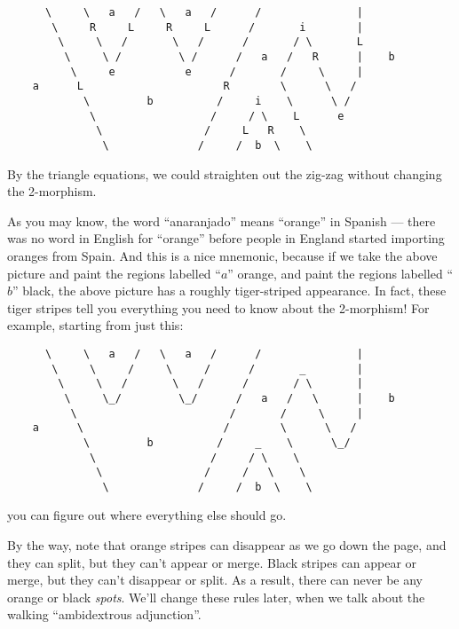 \documentclass{article}
\begin{document}
\begin{verbatim}
      \     \   a   /   \   a   /      /               |
       \     R     L     R     L      /       i        |
        \     \   /       \   /      /       / \       L
         \     \ /         \ /      /   a   /   R      |    b
          \     e           e      /       /     \     |
    a      L                      R        \      \   / 
            \         b          /     i    \      \ / 
             \                  /     / \    L      e
              \                /     L   R    \       
               \              /     /  b  \    \  
\end{verbatim}

By the triangle equations, we could straighten out the zig-zag without
changing the 2-morphism.

As you may know, the word ``anaranjado'' means ``orange'' in Spanish ---
there was no word in English for ``orange'' before people in England
started importing oranges from Spain. And this is a nice mnemonic,
because if we take the above picture and paint the regions labelled
``\(a\)'' orange, and paint the regions labelled ``\(b\)'' black, the
above picture has a roughly tiger-striped appearance. In fact, these
tiger stripes tell you everything you need to know about the 2-morphism!
For example, starting from just this:

\begin{verbatim}
      \     \   a   /   \   a   /      /               |
       \     \     /     \     /      /       _        |
        \     \   /       \   /      /       / \       |
         \     \_/         \_/      /   a   /   \      |    b
          \                        /       /     \     |
    a      \                      /        \      \   / 
            \         b          /     _    \      \_/ 
             \                  /     / \    \      
              \                /     /   \    \       
               \              /     /  b  \    \  
\end{verbatim}

you can figure out where everything else should go.

By the way, note that orange stripes can disappear as we go down the
page, and they can split, but they can't appear or merge. Black stripes
can appear or merge, but they can't disappear or split. As a result,
there can never be any orange or black \emph{spots}. We'll change these
rules later, when we talk about the walking ``ambidextrous adjunction''.
\end{document}
